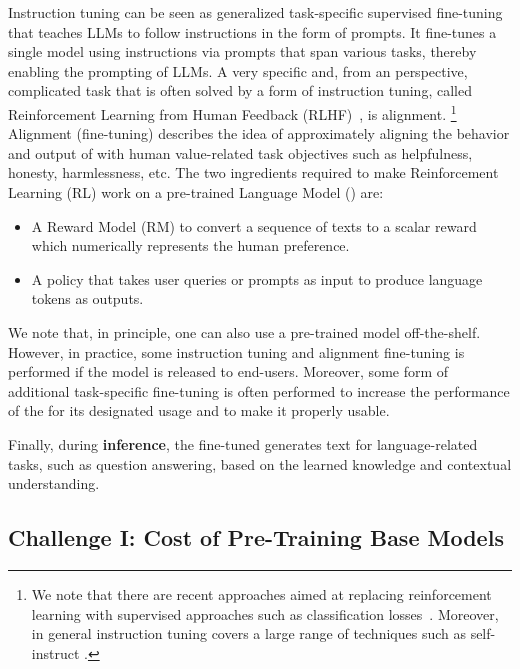 Instruction tuning can be seen as generalized task-specific supervised fine-tuning that teaches LLMs to follow instructions in the form of prompts.
It fine-tunes a single model using instructions via prompts that span various tasks, thereby enabling the prompting of LLMs. A very specific and, from an \AutoML perspective, complicated task that is often solved by a form of instruction tuning, called Reinforcement Learning from Human Feedback (RLHF)~\cite{fernandes-arxiv23a}, is alignment.%
\footnote{We note that there are recent approaches aimed at replacing reinforcement learning with supervised approaches such as classification losses~\cite{rafailov-arxiv23a}. Moreover, in general instruction tuning covers a large range of techniques such as self-instruct \cite{wang-acl23a}.}
Alignment (fine-tuning) describes the idea of approximately aligning the behavior and output of \LLMs with human value-related task objectives such as helpfulness, honesty, harmlessness, etc.
The two ingredients required to make Reinforcement Learning (RL) work on a pre-trained Language Model (\LM) are:
\begin{itemize}[(i)]
    \item A Reward Model (RM) to convert a sequence of texts to a scalar reward which numerically represents the human preference.
    \item A policy that takes user queries or prompts as input to produce language tokens as outputs.
\end{itemize}

We note that, in principle, 
one can also use a pre-trained model off-the-shelf. However, in practice, some instruction tuning and alignment fine-tuning is performed if the model is released to end-users. Moreover, some form of additional task-specific fine-tuning
is often performed to increase the performance of the \LLM for its designated usage and to make it properly usable.

Finally, during \textbf{inference}, the fine-tuned \LLM generates text for language-related tasks, such as question answering, based on the learned knowledge and contextual understanding.

\subsection{Challenge I: Cost of Pre-Training Base Models}

